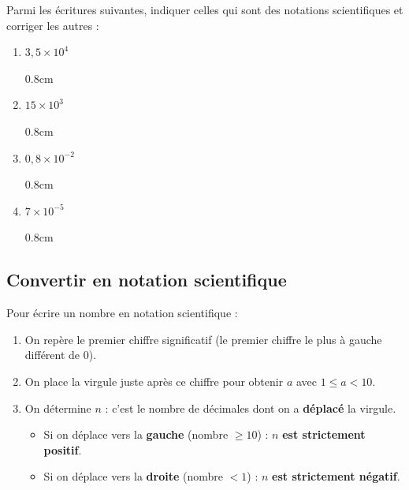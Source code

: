 \documentclass[a4paper]{book}
\begin{document}
    \begin{exemple}
        Parmi les écritures suivantes, indiquer celles qui sont des notations scientifiques et corriger les autres :
        \begin{enumerate}
            \item $3{,}5 \times 10^4$
            \begin{ZoneReponse}{0.8cm}
            \end{ZoneReponse}

            \item $15 \times 10^3$
            \begin{ZoneReponse}{0.8cm}
            \end{ZoneReponse}

            \item $0{,}8 \times 10^{-2}$
            \begin{ZoneReponse}{0.8cm}
            \end{ZoneReponse}

            \item $7 \times 10^{-5}$
            \begin{ZoneReponse}{0.8cm}
            \end{ZoneReponse}
        \end{enumerate}
    \end{exemple}


\subsection{Convertir en notation scientifique}

    \begin{methode}
        Pour écrire un nombre en notation scientifique :
        \begin{enumerate}
            \item On repère le premier chiffre significatif (le premier chiffre le plus à gauche différent de $0$).
            \item On place la virgule juste après ce chiffre pour obtenir $a$ avec $1 \leq a < 10$.
            \item On détermine $n$ : c'est le nombre de décimales dont on a \textbf{déplacé} la virgule.
                \begin{itemize}
                    \item Si on déplace vers la \textbf{gauche} (nombre $\geq 10$) : $n$ \textbf{est strictement positif}.
                    \item Si on déplace vers la \textbf{droite} (nombre $< 1$) : $n$ \textbf{est strictement négatif}.
                \end{itemize}
        \end{enumerate}
    \end{methode}
\end{document}
